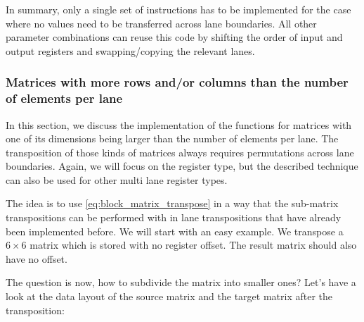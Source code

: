 In summary, only a single set of instructions has to be implemented for the case where no values need to be transferred across lane boundaries.
All other parameter combinations can reuse this code by shifting the order of input and output registers and swapping/copying the relevant lanes.




\subsubsection{Matrices with more rows and/or columns than the number of elements per lane}
\label{sec:Implementation_general_multi_lane_matrices} 

In this section, we discuss the implementation of the  functions for matrices with one of its dimensions being larger than the number of elements per lane.
The transposition of those kinds of matrices always requires permutations across lane boundaries.
Again, we will focus on the  register type, but the described technique can also be used for other multi lane register types.

The idea is to use \cref{eq:block_matrix_transpose} in a way that the sub-matrix transpositions can be performed with in lane transpositions that have already been implemented before.
We will start with an easy example.
We transpose a $6 \times 6$ matrix which is stored with no register offset.
The result matrix should also have no offset.

The question is now, how to subdivide the matrix into smaller ones?
Let's have a look at the data layout of the source matrix and the target matrix after the transposition:



